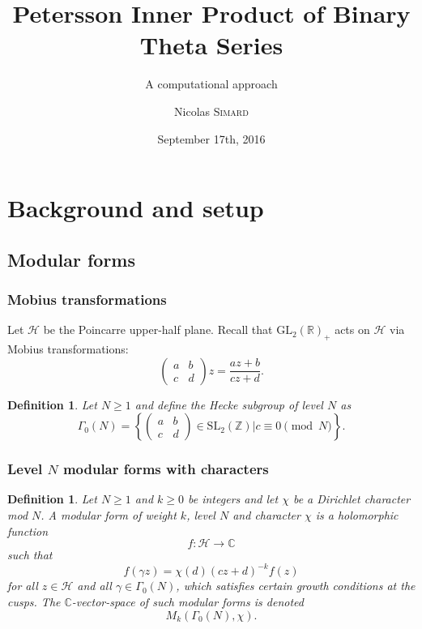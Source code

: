 \documentclass{beamer}
\title{Petersson Inner Product of Binary Theta Series}
\subtitle{A computational approach}
\author{Nicolas \textsc{Simard}}
\institute{McGill University}
\date{September 17th, 2016}
\newcommand{\C}{\mathbb{C}}
\newcommand{\R}{\mathbb{R}}
\newcommand{\Z}{\mathbb{Z}}
\renewcommand{\H}{\mathcal{H}}
\newcommand{\abcdmat}{\begin{pmatrix}
a & b \\ 
c & d
\end{pmatrix}}
\newtheorem{defn}[thm]{Definition}
\begin{document}
\begin{frame}
\titlepage
\end{frame}


\section{Background and setup}
\subsection{Modular forms}

\begin{frame}
\frametitle{Mobius transformations}
Let $\H$ be the Poincarre upper-half plane. Recall that $\text{GL}_2(\R)_+$ acts on $\H$ via Mobius transformations:
\[\abcdmat z=\frac{az+b}{cz+d}.\]
\begin{defn}
	Let $N\geq1$ and define the Hecke subgroup of level $N$ as
	\[\Gamma_0(N)=\left\lbrace\abcdmat \in\text{SL}_2(\Z)| c\equiv 0\pmod N\right\rbrace.\]
\end{defn}
	
\end{frame}

\begin{frame}
\frametitle{Level $N$ modular forms with characters}

\begin{defn}
	Let $N\geq1$ and $k\geq0$ be integers and let $\chi$ be a Dirichlet character mod $N$. A modular form of weight $k$, level $N$ and character $\chi$ is a holomorphic function
	\[f:\H\longrightarrow\C\]
	such that
	\[f\left(\gamma z\right)=\chi(d)(cz+d)^{-k}f(z)\]
	for all $z\in\H$ and all $\gamma\in\Gamma_0(N)$, which satisfies certain growth conditions at the cusps.	The $\C$-vector-space of such modular forms is denoted
	\[M_k(\Gamma_0(N),\chi).\]
\end{defn}
	
\end{frame}	
	
\end{document}

